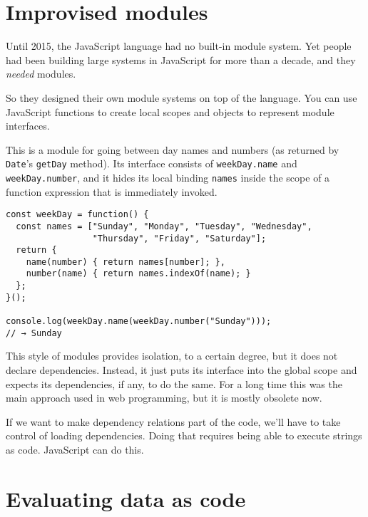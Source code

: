 \section{Improvised modules}

Until 2015, the JavaScript language had no built-in module system. Yet people had been building large systems in JavaScript for more than a decade, and they \emph{needed} modules.

So they designed their own module systems on top of the language. You can use JavaScript functions to create local scopes and objects to represent module interfaces.

This is a module for going between day names and numbers (as returned by \lstinline`Date`'s \lstinline`getDay` method). Its interface consists of \lstinline`weekDay.name` and \lstinline`weekDay.number`, and it hides its local binding \lstinline`names` inside the scope of a function expression that is immediately invoked.

\begin{lstlisting}
const weekDay = function() {
  const names = ["Sunday", "Monday", "Tuesday", "Wednesday",
                 "Thursday", "Friday", "Saturday"];
  return {
    name(number) { return names[number]; },
    number(name) { return names.indexOf(name); }
  };
}();

console.log(weekDay.name(weekDay.number("Sunday")));
// → Sunday
\end{lstlisting}
\noindent{}

This style of modules provides isolation, to a certain degree, but it does not declare dependencies. Instead, it just puts its interface into the global scope and expects its dependencies, if any, to do the same. For a long time this was the main approach used in web programming, but it is mostly obsolete now.

If we want to make dependency relations part of the code, we'll have to take control of loading dependencies. Doing that requires being able to execute strings as code. JavaScript can do this.

\label{modules.eval}\section{Evaluating data as code}

